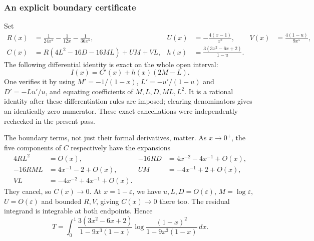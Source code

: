 \documentclass[11pt,a4paper]{article}
\theoremstyle{remark}\newtheorem{remark}[theorem]{Remark}
\numberwithin{equation}{section}
\begin{document}
\subsubsection{An explicit boundary certificate}
Set
\begin{align*}
 R(x)&=\frac1{24x^2}-\frac1{12x}-\frac1{36x^5},&
 U(x)&=-\frac{4(x-1)}{x^2},&
 V(x)&=\frac{4(1-u)}{9x^5},\\
 C(x)&=R(4L^2-16D-16ML)+UM+VL,&
 h(x)&=\frac{3(3x^2-6x+2)}{1-u}.
\end{align*}
The following differential identity is exact on the whole open interval:
\begin{equation}\label{s419:certificate}
 I(x)=C'(x)+h(x)(2M-L).
\end{equation}
One verifies it by using $M'=-1/(1-x)$, $L'=-u'/(1-u)$ and
$D'=-Lu'/u$, and equating coefficients of $M,L,D,M L,L^2$.
It is a rational identity after these differentiation rules are imposed;
clearing denominators gives an identically zero numerator. These exact cancellations were independently rechecked in the present pass.

The boundary terms, not just their formal derivatives, matter. As $x\to0^+$,
the five components of $C$ respectively have the expansions
\begin{align*}
 4RL^2&=O(x),&-16RD&=4x^{-2}-4x^{-1}+O(x),\\
 -16RML&=4x^{-1}-2+O(x),&UM&=-4x^{-1}+2+O(x),\\
 VL&=-4x^{-2}+4x^{-1}+O(x).
\end{align*}
They cancel, so $C(x)\to0$. At $x=1-\varepsilon$, we have
$u,L,D=O(\varepsilon)$, $M=\log\varepsilon$, $U=O(\varepsilon)$ and
bounded $R,V$, giving $C(x)\to0$ there too.
The residual integrand is integrable at both endpoints. Hence
\begin{equation}\label{s419:reducedT}
 T=\int_0^1\frac{3(3x^2-6x+2)}{1-9x^3(1-x)}
       \log\frac{(1-x)^2}{1-9x^3(1-x)}\,dx.
\end{equation}
\end{document}
